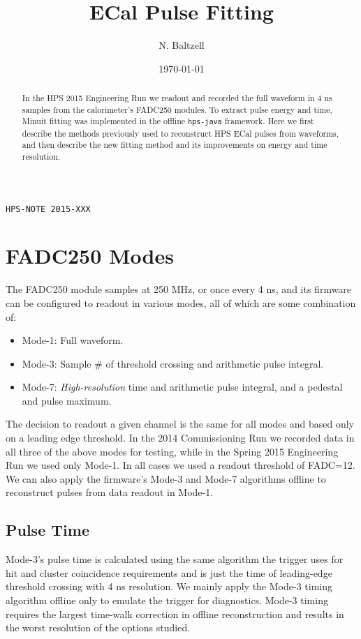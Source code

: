 \documentclass[amsmath,amssymb,notitlepage,12pt]{revtex4-1}
\begin{document}
\hspace*{11.5cm}\texttt{HPS-NOTE 2015-XXX}

\title{ECal Pulse Fitting}
\author{N. Baltzell}
\date{\today}
\begin{abstract}
In the HPS 2015 Engineering Run we readout and recorded the full waveform in 4 ns samples from the calorimeter's FADC250 modules. 
To extract pulse energy and time, Minuit fitting was implemented in the offline \texttt{hps-java} framework.
Here we first describe the methods previously used to reconstruct HPS ECal pulses from waveforms, and then describe the new fitting method and its improvements on energy and time resolution.
\end{abstract}
\maketitle

\section{FADC250 Modes}
The FADC250 module samples at 250 MHz, or once every 4 ns, and its firmware can be configured to readout in various modes, all of which are some combination of:
\begin{itemize}
  \item Mode-1:  Full waveform.
  \item Mode-3:  Sample \# of threshold crossing and arithmetic pulse integral.  
  \item Mode-7:  {\em High-resolution} time and arithmetic pulse integral, and a pedestal and pulse maximum.
\end{itemize}
The decision to readout a given channel is the same for all modes and based only on a leading edge threshold.
In the 2014 Commissioning Run we recorded data in all three of the above modes for testing, while in the Spring 2015 Engineering Run we used only Mode-1.  In all cases we used a readout threshold of FADC=12.
We can also apply the firmware's Mode-3 and Mode-7 algorithms offline to reconstruct pulses from data readout in Mode-1.

\subsection{Pulse Time}
Mode-3's pulse time is calculated using the same algorithm the trigger uses for hit and cluster coincidence requirements and is just the time of leading-edge threshold crossing with 4 ns resolution.  We mainly apply the Mode-3 timing algorithm offline only to emulate the trigger for diagnostics.  Mode-3 timing requires the largest time-walk correction in offline reconstruction and results in the worst resolution of the options studied.
\end{document}
